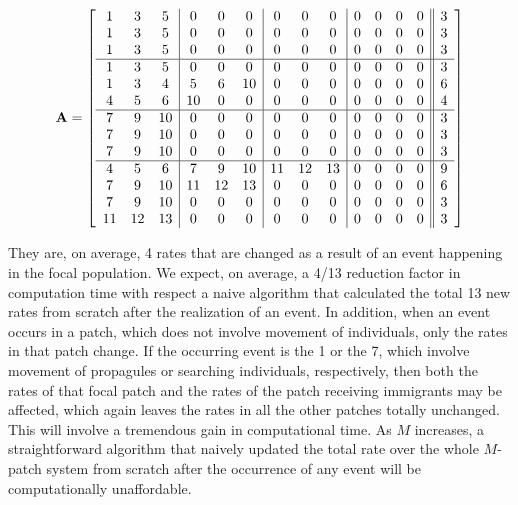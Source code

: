 \begin{equation}
{\bf A} = 
\left[ \begin{array}{ccc|ccc|ccc|cccc||c}
1 & 3 & 5   & 0 & 0 & 0  & 0 & 0 & 0  & 0 & 0 & 0 & 0 & 3\\
1 & 3 & 5   & 0 & 0 & 0  & 0 & 0 & 0  & 0 & 0 & 0 & 0 & 3\\
1 & 3 & 5   & 0 & 0 & 0  & 0 & 0 & 0  & 0 & 0 & 0 & 0 & 3\\
\hline
1 & 3 & 5   & 0  & 0 & 0   & 0 & 0 & 0  & 0 & 0 & 0 & 0 & 3\\
1 & 3 & 4   & 5  & 6 & 10  & 0 & 0 & 0  & 0 & 0 & 0 & 0 & 6\\
4 & 5 & 6   & 10 & 0 & 0   & 0 & 0 & 0  & 0 & 0 & 0 & 0 & 4\\
\hline
7 & 9 & 10  & 0 & 0 & 0  & 0 & 0 & 0  & 0 & 0 & 0 & 0 & 3\\
7 & 9 & 10  & 0 & 0 & 0  & 0 & 0 & 0  & 0 & 0 & 0 & 0 & 3\\
7 & 9 & 10  & 0 & 0 & 0  & 0 & 0 & 0  & 0 & 0 & 0 & 0 & 3\\
\hline
4  & 5  & 6   & 7  & 9  & 10  & 11 & 12 & 13  & 0 & 0 & 0 & 0 & 9\\
7  & 9  & 10  & 11 & 12 & 13  & 0 & 0 & 0     & 0 & 0 & 0 & 0 & 6\\
7  & 9  & 10  & 0  & 0  & 0   & 0 & 0 & 0     & 0 & 0 & 0 & 0 & 3\\
11 & 12 & 13  & 0  & 0  & 0   & 0 & 0 & 0     & 0 & 0 & 0 & 0 & 3\\
\end{array}
\right]
\label{A_E}
\end{equation}

They are, on average, 4 rates that are changed as a result of an event happening in the focal population. We expect, on average, a 4/13 reduction factor in computation time with respect a naive algorithm that calculated the total 13 new rates from scratch after the realization of an event. In addition, when an event occurs in a patch, which does not involve movement of individuals, only the rates in that patch change. If the occurring event is the 1 or the 7, which involve movement of propagules or searching individuals, respectively, then both the rates of that focal patch and the rates of the patch receiving immigrants may be affected, which again leaves the rates in all the other patches totally unchanged. This will involve a tremendous gain in computational time. As $M$ increases, a straightforward algorithm that naively updated the total rate over the whole $M$-patch system from scratch after the occurrence of any event will be computationally unaffordable.   
  

